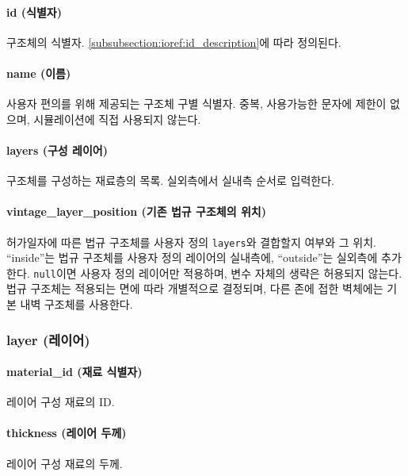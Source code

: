 \paragraph{id (식별자)} 구조체의 식별자. \ref{subsubsection:ioref:id_description}에 따라 정의된다.

\paragraph{name (이름)} 사용자 편의를 위해 제공되는 구조체 구별 식별자. 중복, 사용가능한 문자에 제한이 없으며, 시뮬레이션에 직접 사용되지 않는다.

\paragraph{layers (구성 레이어)} 구조체를 구성하는 재료층의 목록. 실외측에서 실내측 순서로 입력한다.

\paragraph{vintage\_layer\_position (기존 법규 구조체의 위치)} 허가일자에 따른 법규 구조체를 사용자 정의 \texttt{layers}와 결합할지 여부와 그 위치. ``inside''는 법규 구조체를 사용자 정의 레이어의 실내측에, ``outside''는 실외측에 추가한다. \texttt{null}이면 사용자 정의 레이어만 적용하며, 변수 자체의 생략은 허용되지 않는다. 법규 구조체는 적용되는 면에 따라 개별적으로 결정되며, 다른 존에 접한 벽체에는 기본 내벽 구조체를 사용한다.

\subsubsection{layer (레이어)} \label{subsubsection:ioref:layer}


\paragraph{material\_id (재료 식별자)} 레이어 구성 재료의 ID.

\paragraph{thickness (레이어 두께)} 레이어 구성 재료의 두께.

